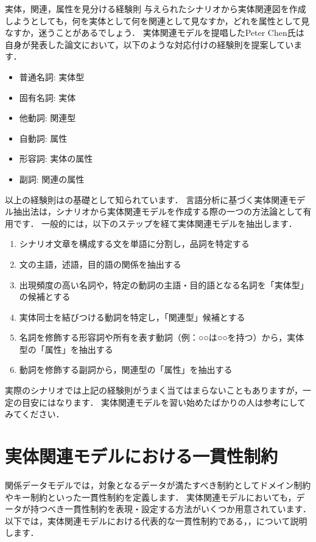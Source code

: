 \begin{notebox}{実体，関連，属性を見分ける経験則}
与えられたシナリオから実体関連図を作成しようとしても，何を実体として何を関連として見なすか，どれを属性として見なすか，迷うことがあるでしょう．
実体関連モデルを提唱したPeter Chen氏は自身が発表した論文\cite{Chen1983}において，以下のような対応付けの経験則を提案しています．
\begin{itemize}
\item 普通名詞: 実体型
\item 固有名詞: 実体
\item 他動詞: 関連型
\item 自動詞: 属性
\item 形容詞: 実体の属性
\item 副詞: 関連の属性
\end{itemize}
以上の経験則はの基礎として知られています．
言語分析に基づく実体関連モデル抽出法は，シナリオから実体関連モデルを作成する際の一つの方法論として有用です．
一般的には，以下のステップを経て実体関連モデルを抽出します．
\begin{enumerate}
\item シナリオ文章を構成する文を単語に分割し，品詞を特定する
\item 文の主語，述語，目的語の関係を抽出する
\item 出現頻度の高い名詞や，特定の動詞の主語・目的語となる名詞を「実体型」の候補とする
\item 実体同士を結びつける動詞を特定し，「関連型」候補とする
\item 名詞を修飾する形容詞や所有を表す動詞（例：○○は○○を持つ）から，実体型の「属性」を抽出する
\item 動詞を修飾する副詞から，関連型の「属性」を抽出する
\end{enumerate}

実際のシナリオでは上記の経験則がうまく当てはまらないこともありますが，一定の目安にはなります．
実体関連モデルを習い始めたばかりの人は参考にしてみてください．
\end{notebox}


\section{実体関連モデルにおける一貫性制約}
関係データモデルでは，対象となるデータが満たすべき制約としてドメイン制約やキー制約といった一貫性制約を定義します．
実体関連モデルにおいても，データが持つべき一貫性制約を表現・設定する方法がいくつか用意されています．
以下では，実体関連モデルにおける代表的な一貫性制約である，，について説明します．

